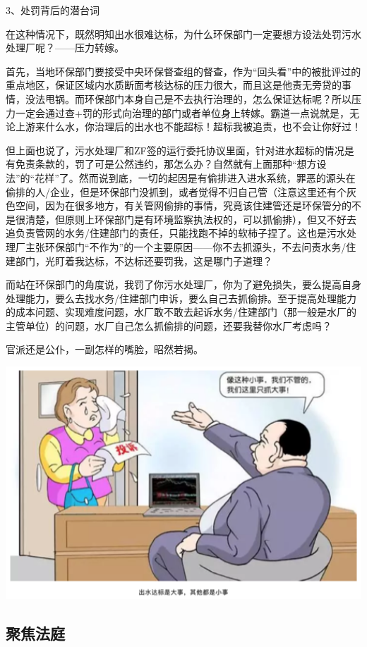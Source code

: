 \documentclass[]{book}
\begin{document}
3、处罚背后的潜台词

在这种情况下，既然明知出水很难达标，为什么环保部门一定要想方设法处罚污水处理厂呢？------压力转嫁。

首先，当地环保部门要接受中央环保督查组的督查，作为``回头看''中的被批评过的重点地区，保证区域内水质断面考核达标的压力很大，而且这是他责无旁贷的事情，没法甩锅。而环保部门本身自己是不去执行治理的，怎么保证达标呢？所以压力一定会通过查+罚的形式向治理的部门或者单位身上转嫁。霸道一点说就是，无论上游来什么水，你治理后的出水也不能超标！超标我被追责，也不会让你好过！

但上面也说了，污水处理厂和ZF签的运行委托协议里面，针对进水超标的情况是有免责条款的，罚了可是公然违约，那怎么办？自然就有上面那种``想方设法''的``花样''了。然而说到底，一切的起因是有偷排进入进水系统，罪恶的源头在偷排的人/企业，但是环保部门没抓到，或者觉得不归自己管（注意这里还有个灰色空间，因为在很多地方，有关管网偷排的事情，究竟该住建管还是环保管分的不是很清楚，但原则上环保部门是有环境监察执法权的，可以抓偷排），但又不好去追负责管网的水务/住建部门的责任，只能找跑不掉的软柿子捏了。这也是污水处理厂主张环保部门``不作为''的一个主要原因------你不去抓源头，不去问责水务/住建部门，光盯着我达标，不达标还要罚我，这是哪门子道理？

而站在环保部门的角度说，我罚了你污水处理厂，你为了避免损失，要么提高自身处理能力，要么去找水务/住建部门申诉，要么自己去抓偷排。至于提高处理能力的成本问题、实现难度问题，水厂敢不敢去起诉水务/住建部门（那一般是水厂的主管单位）的问题，水厂自己怎么抓偷排的问题，还要我替你水厂考虑吗？

官派还是公仆，一副怎样的嘴脸，昭然若揭。

\includegraphics[width=6.67in]{images/py3}

\hypertarget{ux805aux7126ux6cd5ux5ead}{%
\subsection{聚焦法庭}\label{ux805aux7126ux6cd5ux5ead}}
\end{document}
